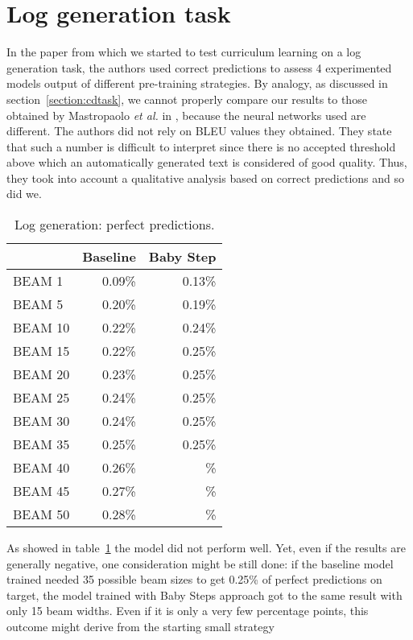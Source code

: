 \section{Log generation task}
In the paper from which we started to test curriculum learning on a log generation task, the authors used
correct predictions to assess 4 experimented models output of different pre-training strategies. 
By analogy, as discussed in section~\ref{section:cdtask}, we cannot properly compare our results to those 
obtained by Mastropaolo \textit{et al.} in \cite{Mastropaolo2022}, because the neural networks used are different.
The authors did not rely on BLEU values they obtained. They state that such a number is difficult to 
interpret since there is no accepted threshold above which an automatically generated text is considered of 
good quality. Thus, they took into account a qualitative analysis based on correct predictions and so did we.
\begin{table}[h!]
    \centering
    \begin{tabular}{l|r|r} 
    & Baseline & Baby Step\\ [0.5ex] 
    \hline
    BEAM 1 & 0.09\% &  0.13\%\\  
    BEAM 5 &  0.20\% &  0.19\% \\ 
    BEAM 10 &  0.22\% &  0.24\%\\
    BEAM 15 &  0.22\% &  0.25\%\\
    BEAM 20 &  0.23\% &  0.25\%\\
    BEAM 25 &  0.24\% &  0.25\%\\
    BEAM 30 &  0.24\% &  0.25\%\\
    BEAM 35 &  0.25\% &  0.25\%\\
    BEAM 40 &  0.26\% &  \%\\
    BEAM 45 &  0.27\%& \%\\
    BEAM 50 &  0.28\%& \%\\ [1ex]
    \end{tabular}
    \caption{Log generation: perfect predictions.}
    \label{table:3}
\end{table}
As showed in table~\ref{table:3} the model did not perform well. 
Yet, even if the results are generally negative, one consideration might be still done:
if the baseline model trained needed 35 possible
beam sizes to get 0.25\% of perfect predictions on target, the model trained with Baby Steps approach got to the same 
result with only 15 beam widths. Even if it is only a very few percentage points, this outcome might derive from the starting small strategy
